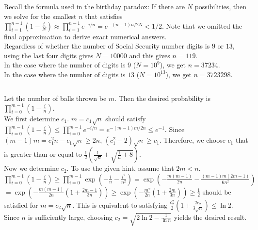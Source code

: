 \documentclass{article}
\begin{document}
\subsection{}
Recall the formula used in the birthday paradox: If there are $N$ possibilities, then we solve for the smallest $n$ that satisfies
$\prod\limits_{i=1}^{n-1}(1-\frac{i}{N})\approx\prod\limits_{i=1}^{n-1}e^{-i/n}=e^{-(n-1)n/2N}<1/2$.
Note that we omitted the final approximation to derive exact numerical answers.\\
Regardless of whether the number of Social Security number digits is $9$ or $13$, using the last four digits gives $N=10000$ and this gives $n=119$.\\
In the case where the number of digits is $9$ ($N=10^9$), we get $n=37234$.\\
In the case where the number of digits is $13$ ($N=10^{13}$), we get $n=3723298$.
\subsection{}
Let the number of balls thrown be $m$. Then the desired probability is $\prod\limits_{i=0}^{m-1}(1-\frac{i}{n})$.\\
We first determine $c_1$.
$m=c_1\sqrt{n}$ should satisfy $\prod\limits_{i=0}^{m-1}(1-\frac{i}{n}) \leq \prod\limits_{i=0}^{m-1}e^{-i/n}=e^{-(m-1)m/2n}\leq e^{-1}$.
Since $(m-1)m=c_1^2n-c_1\sqrt{n}\geq 2n$, $(c_1^2-2)\sqrt{n}\geq c_1$.
Therefore, we choose $c_1$ that is greater than or equal to $\frac{1}{2}\left(\frac{1}{\sqrt{n}}+\sqrt{\frac{1}{n}+8}\right)$.\\
Now we determine $c_2$. To use the given hint, assume that $2m < n$.\\
$\prod\limits_{i=0}^{m-1}(1-\frac{i}{n})\geq\prod\limits_{i=0}^{m-1}\exp(-\frac{i}{n}-\frac{i^2}{n^2})=\exp(-\frac{m(m-1)}{2n}-\frac{(m-1)m(2m-1)}{6n^2})$\\
$=\exp(-\frac{m(m-1)}{2n}(1+\frac{2m-1}{3n}))\geq\exp(-\frac{m^2}{2n}(1+\frac{2m}{3n}))\geq \frac{1}{2}$ should be satisfied for $m=c_2\sqrt{n}$.
This is equivalent to satisfying $\frac{c_2^2}{2}(1+\frac{2c_2}{3\sqrt{n}})\leq \ln 2$.\\
Since $n$ is sufficiently large, choosing $c_2 = \sqrt{2\ln2 - \frac{1}{\ln n}}$ yields the desired result.
\end{document}
